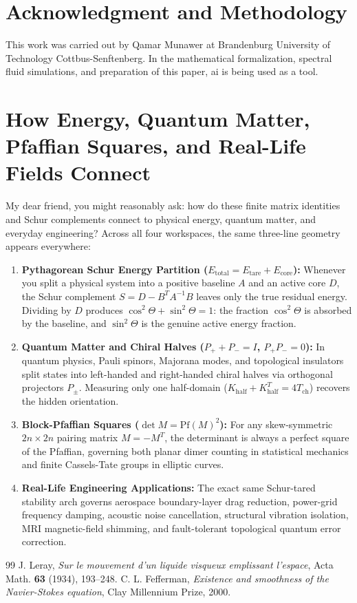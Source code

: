 \documentclass[11pt,a4paper]{article}
\theoremstyle{definition}
\begin{document}
\section*{Acknowledgment and Methodology}
This work was carried out by Qamar Munawer at Brandenburg University of Technology Cottbus-Senftenberg. In the mathematical formalization, spectral fluid simulations, and preparation of this paper, ai is being used as a tool.


\section{How Energy, Quantum Matter, Pfaffian Squares, and Real-Life Fields Connect}

My dear friend, you might reasonably ask: how do these finite matrix identities and Schur complements connect to physical energy, quantum matter, and everyday engineering? Across all four workspaces, the same three-line geometry appears everywhere:

\begin{enumerate}
  \item \textbf{Pythagorean Schur Energy Partition ($E_{\mathrm{total}} = E_{\mathrm{tare}} + E_{\mathrm{core}}$):} Whenever you split a physical system into a positive baseline $A$ and an active core $D$, the Schur complement $S = D - B^T A^{-1} B$ leaves only the true residual energy. Dividing by $D$ produces $\cos^2\Theta + \sin^2\Theta = 1$: the fraction $\cos^2\Theta$ is absorbed by the baseline, and $\sin^2\Theta$ is the genuine active energy fraction.
  \item \textbf{Quantum Matter and Chiral Halves ($P_+ + P_- = I$, $P_+ P_- = 0$):} In quantum physics, Pauli spinors, Majorana modes, and topological insulators split states into left-handed and right-handed chiral halves via orthogonal projectors $P_\pm$. Measuring only one half-domain ($K_{\mathrm{half}} + K_{\mathrm{half}}^T = 4 T_{\mathrm{ch}}$) recovers the hidden orientation.
  \item \textbf{Block-Pfaffian Squares ($\det M = \mathrm{Pf}(M)^2$):} For any skew-symmetric $2n \times 2n$ pairing matrix $M = -M^T$, the determinant is always a perfect square of the Pfaffian, governing both planar dimer counting in statistical mechanics and finite Cassels-Tate groups in elliptic curves.
  \item \textbf{Real-Life Engineering Applications:} The exact same Schur-tared stability arch governs aerospace boundary-layer drag reduction, power-grid frequency damping, acoustic noise cancellation, structural vibration isolation, MRI magnetic-field shimming, and fault-tolerant topological quantum error correction.
\end{enumerate}

\begin{thebibliography}{99}
 J. Leray, \emph{Sur le mouvement d'un liquide visqueux emplissant l'espace}, Acta Math. \textbf{63} (1934), 193--248.
 C. L. Fefferman, \emph{Existence and smoothness of the Navier-Stokes equation}, Clay Millennium Prize, 2000.
\end{thebibliography}
\end{document}
